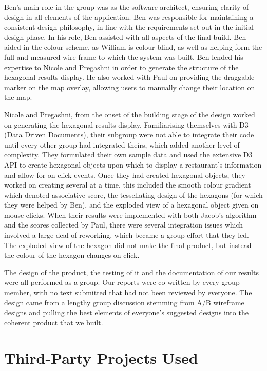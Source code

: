 \documentclass[10pt,a4paper]{article}
\begin{document}
Ben’s main role in the group was as the software architect, ensuring clarity of design in all elements of the application. Ben was responsible for maintaining a consistent design philosophy, in line with the requirements set out in the initial design phase. In his role, Ben assisted with all aspects of the final build. Ben aided in the colour-scheme, as William is colour blind, as well as helping form the full and measured wire-frame to which the system was built. Ben lended his expertise to Nicole and Pregashni in order to generate the structure of the hexagonal results display. He also worked with Paul on providing the draggable marker on the map overlay, allowing users to manually change their location on the map.

Nicole and Pregashni, from the onset of the building stage of the design worked on generating the hexagonal results display. Familiarising themselves with D3 (Data Driven Documents), their subgroup were not able to integrate their code until every other group had integrated theirs, which added another level of complexity. They formulated their own sample data and used the extensive D3 API to create hexagonal objects upon which to display a restaurant's information and allow for on-click events. Once they had created hexagonal objects, they worked on creating several at a time, this included the smooth colour gradient which denoted associative score, the tessellating design of the hexagons (for which they were helped by Ben), and the exploded view of a hexagonal object given on mouse-clicks. When their results were implemented with both Jacob’s algorithm and the scores collected by Paul, there were several integration issues which involved a large deal of reworking, which became a group effort that they led. The exploded view of the hexagon did not make the final product, but instead the colour of the hexagon changes on click.

The design of the product, the testing of it and the documentation of our results were all performed as a group. Our reports were co-written by every group member, with no text submitted that had not been reviewed by everyone. The design came from a lengthy group discussion stemming from A/B wireframe designs and pulling the best elements of everyone’s suggested designs into the coherent product that we built.


\section*{Third-Party Projects Used}
\end{document}
